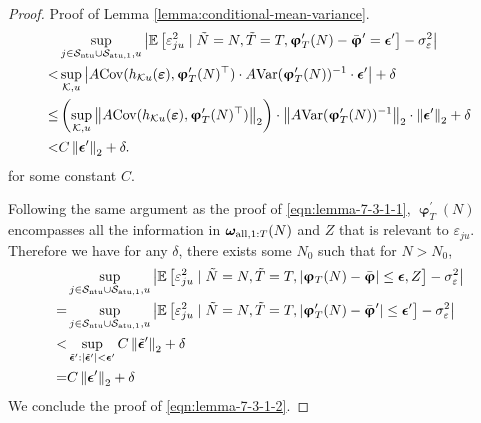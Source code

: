 \begin{proof}{Proof of Lemma \ref{lemma:conditional-mean-variance}.}
\begin{align*}
    & \sup_{j \in \mathcal{S}_{\mathrm{ntu}} \cup \mathcal{S}_{\mathrm{atu},1},u} \left|\mathbb{E}\left[\varepsilon^2_{ju} \mid \tilde{N} = N, \tilde{T} = T, \bm{\upvarphi}^\prime_T(N) - \bar{\bm{\upvarphi}}^\prime = \bm{\epsilon}^\prime\right] - \sigma^2_\varepsilon \right| \\
    <& \sup_{\mathcal{K},u}  \left| A\mathrm{Cov} (h_{\mathcal{K}u}(\bm{\varepsilon}), \bm{\upvarphi}^\prime_T(N)^\top)  \cdot A\mathrm{Var}(\bm{\upvarphi}^\prime_T(N))^{-1} \cdot \bm{\epsilon}^\prime \right|  + {\delta}  \\
    \leq& \left(\sup_{\mathcal{K},u}  \left\lVert A\mathrm{Cov} (h_{\mathcal{K}u}(\bm{\varepsilon}), \bm{\upvarphi}^\prime_T(N)^\top)\right\rVert_2 \right) \cdot \left\lVert A\mathrm{Var}(\bm{\upvarphi}^\prime_T(N))^{-1}\right\rVert_2 \cdot \left\lVert\bm{\epsilon}^\prime\right\rVert_2 + {\delta}  \\
    <& C \left\lVert\bm{\epsilon}^\prime\right\rVert_2 +  {\delta}.
\end{align*}
for some constant $C$.

Following the same argument as the proof of \eqref{eqn:lemma-7-3-1-1}, $\bm{\upvarphi}^\prime_T(N) $ encompasses all the information in $\bm{\omega}_{\mathrm{all},1:T}(N)$ and $Z$ that is relevant to $\varepsilon_{ju}$. Therefore we have for any ${\delta}$, there exists some $N_0$ such that for $N > N_0$, 
\begin{align*}
&\sup_{j \in \mathcal{S}_{\mathrm{ntu}} \cup \mathcal{S}_{\mathrm{atu},1}, u} \left|\mathbb{E}\left[\varepsilon_{ju}^2  \mid \tilde{N} = N, \tilde{T} = T, |\bm{\upvarphi}_T(N) - \bar{\bm{\upvarphi}}| \leq {\bm{\epsilon}}, Z \right] - \sigma_\varepsilon^2\right| \\
=&\sup_{j \in \mathcal{S}_{\mathrm{ntu}} \cup \mathcal{S}_{\mathrm{atu},1},u} \left|\mathbb{E}\left[\varepsilon^2_{ju} \mid \tilde{N} = N, \tilde{T} = T, |\bm{\upvarphi}^\prime_T(N) - \bar{\bm{\upvarphi}}^\prime| \leq \bm{\epsilon}^\prime\right] - \sigma^2_\varepsilon \right| \\
<& \sup_{\tilde{\bm{\epsilon}}^\prime: |\tilde{\bm{\epsilon}}^\prime| < \bm{\epsilon}^\prime } C \left\lVert\tilde{\bm{\epsilon}}^\prime\right\rVert_2 +  {\delta} \\
=& C \left\lVert{\bm{\epsilon}}^\prime\right\rVert_2 +  {\delta}
\end{align*} 
We conclude the proof of \eqref{eqn:lemma-7-3-1-2}.



\end{proof}
